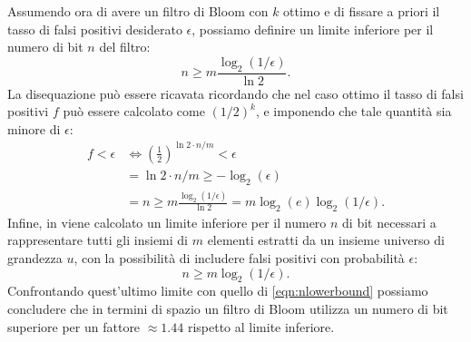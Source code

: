 \documentclass[../../main.tex]{subfiles}
\begin{document}
Assumendo ora di avere un filtro di Bloom con $k$ ottimo e di fissare a priori il tasso di falsi positivi desiderato $\epsilon$, possiamo definire un limite inferiore per il numero di bit $n$ del filtro: 
\begin{equation}
    n \geq m \frac{\log_2(1/\epsilon)}{\ln2}.
    \label{eqn:nlowerbound}
\end{equation}
La disequazione può essere ricavata ricordando che nel caso ottimo il tasso di falsi positivi $f$ può essere calcolato come $\left(1/2\right)^k$, e imponendo che tale quantità sia minore di $\epsilon$:
\begin{align*}
    f < \epsilon &\Leftrightarrow \left(\frac{1}{2}\right)^{\ln2 \cdot n/m} < \epsilon\\
    &= \ln2 \cdot n/m \geq - \log_2(\epsilon) \\
    &= n \geq m \frac{\log_2(1/\epsilon)}{\ln2} = m \log_2(e) \log_2(1/\epsilon) .
\end{align*}
Infine, in \cite{Broder2005} viene calcolato un limite inferiore per il numero $n$ di bit necessari a rappresentare tutti gli insiemi di $m$ elementi estratti da un insieme universo di grandezza $u$, con la possibilità di includere falsi positivi con probabilità $\epsilon$:
\[n \geq m \log_2(1/\epsilon).\]
Confrontando quest'ultimo limite con quello di \eqref{eqn:nlowerbound} possiamo concludere che in termini di spazio un filtro di Bloom utilizza un numero di bit superiore per un fattore $\approx 1.44$ rispetto al limite inferiore.
\end{document}
